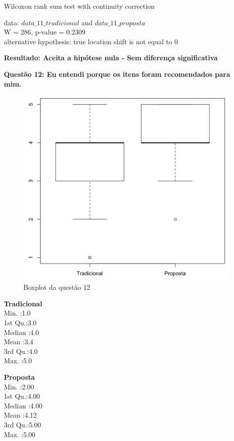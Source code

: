 Wilcoxon rank sum test with continuity correction

\noindent
data:  $data\_11\_tradicional$ and $data\_11\_proposta$\\
W = 286, p-value = 0.2309\\
alternative hypothesis: true location shift is not equal to 0

\textbf{Resultado: Aceita a hipótese nula - Sem diferença significativa}

\newpage
\textbf{Questão 12: Eu entendi porque os itens foram recomendados para mim.}

\begin{figure}[htb]
  \caption{\label{fig:questao12-boxplot}Boxplot da questão 12}
  \begin{center}
      \includegraphics[scale=0.4]{./Figuras/questao12-boxplot.png}
  \end{center}
\end{figure}

\begin{multicols}{2}

\noindent\textbf{Tradicional}\\
Min.   :1.0\\
1st Qu.:3.0\\
Median :4.0\\
Mean   :3.4\\
3rd Qu.:4.0\\
Max.   :5.0\\
\columnbreak

\noindent\textbf{Proposta}\\
Min.   :2.00\\
1st Qu.:4.00\\
Median :4.00\\
Mean   :4.12\\
3rd Qu.:5.00\\
Max.   :5.00
\end{multicols}

